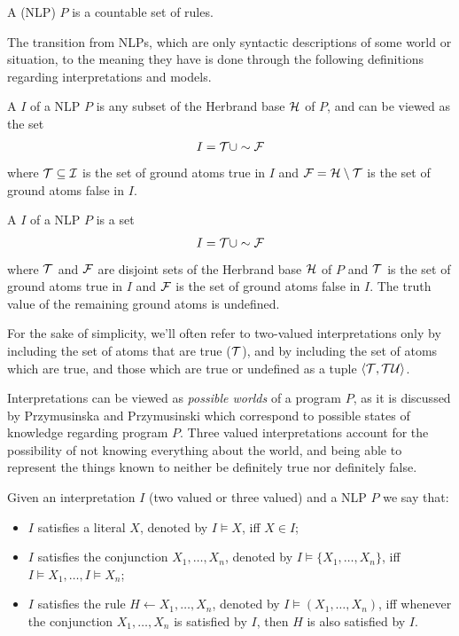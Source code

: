 \begin{definition}[\NLP]
A \nlp (NLP) $P$ is a countable set of rules.
\end{definition}

The transition from NLPs, which are only syntactic descriptions of some world or situation, to the meaning they have is done through the following definitions regarding interpretations and models.


\begin{definition}
A \twovi $I$ of a NLP $P$ is any subset of the Herbrand base $\cal{H}$ of $P$, and can be viewed as the set
\begin{align*}
I=\cal{T}\cup\sim \cal{F}
\end{align*}
where $\cal{T}\subseteq I$ is the set of ground atoms true in $I$ and $\cal{F}=\cal{H}\setminus \cal{T}$ is the set of ground atoms false in $I$.
\end{definition}

\begin{definition}
\label{def:threeVI}
A \threevi $I$ of a NLP $P$ is a set
\begin{align*}
I=\cal{T}\cup\sim \cal{F}
\end{align*}
where $\cal{T}$ and $\cal{F}$ are disjoint sets of the Herbrand base $\cal{H}$ of $P$ and $\cal{T}$ is the set of ground atoms true in $I$ and $\cal{F}$ is the set of ground atoms false in $I$. The truth value of the remaining ground atoms is undefined.
\end{definition}

For the sake of simplicity, we'll often refer to two-valued interpretations only by including the set of atoms that are true ($\cal{T}$), and \threevi by including the set of atoms which are true, and those which are true or undefined as a tuple $\langle\cal{T},\cal{TU}\rangle$.

Interpretations can be viewed as \emph{possible worlds} of a program $P$, as it is discussed by Przymusinska and Przymusinski\cite{semanticIssues} which correspond to possible states of knowledge regarding program $P$. Three valued interpretations account for the possibility of not knowing everything about the world, and being able to represent the things known to neither be definitely true nor definitely false.

\begin{definition}[Satisfaction]
Given an interpretation $I$ (two valued or three valued) and a NLP $P$ we say that:
\begin{itemize}
	\item $I$ satisfies a literal $X$, denoted by $I\models X$, iff $X\in I$;
	\item $I$ satisfies the conjunction $X_{1},\ldots,X_{n}$, denoted by $I\models \{X_{1},\ldots,X_{n}\}$, iff $I\models X_{1},\ldots,I\models X_{n}$;
	\item $I$ satisfies the rule $H\leftarrow X_{1},\ldots,X_{n}$, denoted by $I\models (X_{1},\ldots,X_{n})$, iff whenever the conjunction $X_{1},\ldots,X_{n}$ is satisfied by $I$, then $H$ is also satisfied by $I$.
\end{itemize}
\end{definition}



